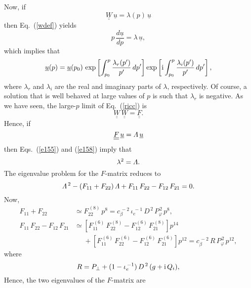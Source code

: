 \documentclass[12pt,prb,aps]{revtex4-1}
\begin{document}
Now, if
\begin{equation}\label{e155}
\underline{\underline{W}}\,\underline{u}= \lambda(p)\,\underline{u}
\end{equation}
then Eq.~(\ref{wdef}) yields
\begin{equation}
p\,\frac{d\underline{u}}{dp} = \lambda\,\underline{u},
\end{equation}
which implies that
\begin{equation}
\underline{u}(p) = \underline{u}(p_0)\,\exp\left[\int_{p_0}^p\frac{\lambda_r(p')}{p'}\,dp'\right]\exp\left[{\rm i}\int_{p_0}^p\frac{\lambda_i(p')}{p'}\,dp'\right], 
\end{equation}
where $\lambda_r$  and $\lambda_i$ are the real and imaginary parts of $\lambda$, respectively. 
Of course, a solution that is well behaved at large values of $p$ is such that $\lambda_r$ is negative. As we have seen, the large-$p$ limit of
Eq.~(\ref{ricc}) is
\begin{equation}
\underline{\underline{W}}\,\underline{\underline{W}} = \underline{\underline{F}}.
\end{equation}
Hence, if
\begin{equation}\label{e158}
 \underline{\underline{F}}\,\underline{u} = {\mit\Lambda}\,\underline{u}
 \end{equation}
 then Eqs.~(\ref{e155}) and (\ref{e158}) imply that 
 \begin{equation}
 \lambda^2 = {\mit\Lambda}.
 \end{equation}
 The eigenvalue problem for the $F$-matrix reduces to
 \begin{equation}
 {\mit\Lambda}^{\,2}- (F_{11}+ F_{22})\,{\mit\Lambda} + F_{11}\,F_{22} - F_{12}\,F_{21}=0.
 \end{equation}
 Now,
 \begin{align}
 F_{11}+F_{22}&\simeq  F_{22}^{\,(8)}\,p^8 =c_\beta^{\,-2}\, \iota_e^{\,-1}\,D^{\,2}\,P_\varphi^{\,2}\,p^8,\\[0.5ex]
 F_{11}\,F_{22} - F_{12}\,F_{21}&  \simeq \left[F_{11}^{\,(6)}\,F_{22}^{\,(8)} - F_{12}^{\,(6)}\,F_{21}^{\,(8)}\right]p^{14}\nonumber\\[0.5ex]&\phantom{=}+\left[F_{11}^{\,(6)}\,F_{22}^{\,(6)} - F_{12}^{\,(6)}\,F_{21}^{\,(6)}\right]p^{12}
=c_\beta^{\,-2}\,R\,P_\varphi^{\,2}\,p^{12},
 \end{align}
  where 
 \begin{equation}
 R= P_\perp + (1-\iota_e^{\,-1})\,D^{\,2}\,(g+{\rm i}\,Q_i),
 \end{equation}
Hence, the two eigenvalues of the $F$-matrix are
\end{document}
